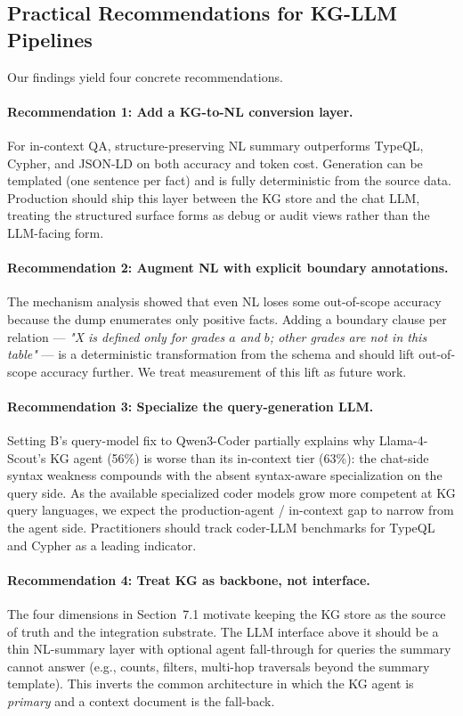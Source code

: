 \subsection{Practical Recommendations for KG-LLM Pipelines}

Our findings yield four concrete recommendations.

\paragraph{Recommendation 1: Add a KG-to-NL conversion layer.} For
in-context QA, structure-preserving NL summary outperforms TypeQL,
Cypher, and JSON-LD on both accuracy and token cost. Generation can
be templated (one sentence per fact) and is fully deterministic
from the source data. Production should ship this layer between the
KG store and the chat LLM, treating the structured surface forms as
debug or audit views rather than the LLM-facing form.

\paragraph{Recommendation 2: Augment NL with explicit boundary
annotations.} The mechanism analysis showed that even NL loses some
out-of-scope accuracy because the dump enumerates only positive
facts. Adding a boundary clause per relation — \emph{"X is defined
only for grades $a$ and $b$; other grades are not in this table"} —
is a deterministic transformation from the schema and should lift
out-of-scope accuracy further. We treat measurement of this lift
as future work.

\paragraph{Recommendation 3: Specialize the query-generation LLM.}
Setting B's query-model fix to Qwen3-Coder partially explains why
Llama-4-Scout's KG agent (56\%) is worse than its in-context tier
(63\%): the chat-side syntax weakness compounds with the absent
syntax-aware specialization on the query side. As the available
specialized coder models grow more competent at KG query languages,
we expect the production-agent / in-context gap to narrow from the
agent side. Practitioners should track coder-LLM benchmarks for
TypeQL and Cypher as a leading indicator.

\paragraph{Recommendation 4: Treat KG as backbone, not interface.}
The four dimensions in Section~7.1 motivate keeping the KG store as
the source of truth and the integration substrate. The LLM
interface above it should be a thin NL-summary layer with optional
agent fall-through for queries the summary cannot answer (e.g.,
counts, filters, multi-hop traversals beyond the summary template).
This inverts the common architecture in which the KG agent is
\emph{primary} and a context document is the fall-back.

